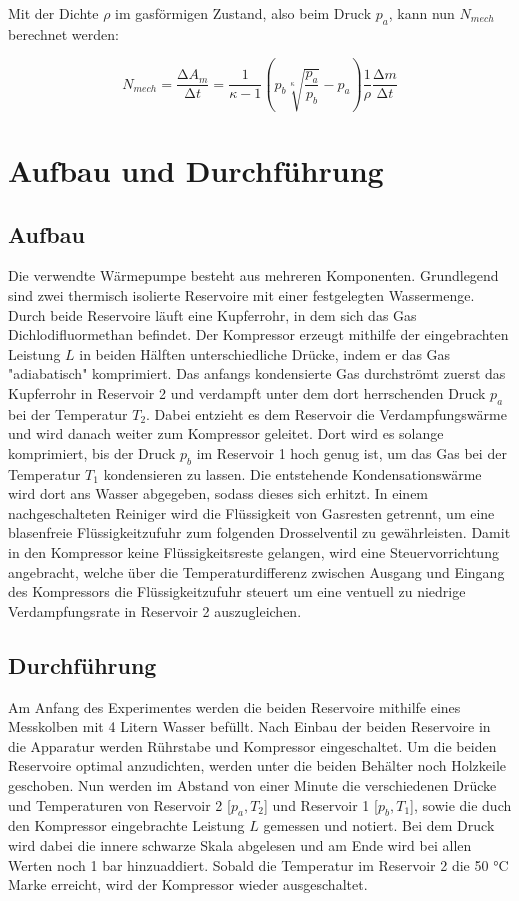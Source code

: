 Mit der Dichte $\rho$ im gasförmigen Zustand, also beim Druck $p_a$, kann nun $N_{mech}$ berechnet werden:

\begin{equation}
  \label{eqn:Nmech}
  N_{mech} = \frac{\increment A_m}{\increment t} =  \frac{1}{\kappa - 1} \left( p_b \sqrt[\kappa]{\frac{p_a}{p_b}} - p_a \right) \frac{1}{\rho} \frac{\increment m}{\increment t}
\end{equation}

\section{Aufbau und Durchführung}

\subsection{Aufbau}

Die verwendte Wärmepumpe besteht aus mehreren Komponenten. Grundlegend sind zwei thermisch isolierte Reservoire mit einer festgelegten
Wassermenge. Durch beide Reservoire läuft eine Kupferrohr, in dem sich das Gas Dichlodifluormethan befindet. Der Kompressor erzeugt
mithilfe der eingebrachten Leistung $L$ in beiden
Hälften unterschiedliche Drücke, indem er das Gas "adiabatisch" komprimiert. Das anfangs kondensierte Gas durchströmt zuerst das Kupferrohr in Reservoir 2 und
verdampft unter dem dort herrschenden Druck $p_a$ bei der Temperatur $T_2$. Dabei entzieht es dem Reservoir die Verdampfungswärme und wird danach
weiter zum Kompressor geleitet. Dort wird es solange komprimiert, bis der Druck $p_b$ im Reservoir 1 hoch genug ist, um das Gas bei der
Temperatur $T_1$ kondensieren zu lassen. Die entstehende
Kondensationswärme wird dort ans Wasser abgegeben, sodass dieses sich erhitzt. In einem nachgeschalteten Reiniger wird die Flüssigkeit
von Gasresten getrennt, um eine blasenfreie Flüssigkeitzufuhr zum folgenden Drosselventil zu gewährleisten. Damit in den Kompressor keine
Flüssigkeitsreste gelangen, wird eine Steuervorrichtung angebracht, welche über die Temperaturdifferenz zwischen Ausgang und Eingang
des Kompressors die Flüssigkeitzufuhr steuert um eine ventuell zu niedrige Verdampfungsrate in Reservoir 2 auszugleichen.

\subsection{Durchführung}

Am Anfang des Experimentes werden die beiden Reservoire mithilfe eines Messkolben mit 4 Litern Wasser befüllt. Nach Einbau der beiden Reservoire
in die Apparatur werden Rührstabe und Kompressor eingeschaltet. Um die beiden Reservoire optimal anzudichten, werden unter die beiden Behälter
noch Holzkeile geschoben. Nun werden im Abstand von einer Minute die verschiedenen Drücke und Temperaturen
von Reservoir 2 [$p_a, T_2$] und Reservoir 1 [$p_b, T_1$], sowie die duch den Kompressor eingebrachte Leistung $L$ gemessen und notiert. Bei dem Druck
wird dabei die innere schwarze Skala abgelesen und am Ende wird bei allen Werten noch 1 bar hinzuaddiert. Sobald
die Temperatur im Reservoir 2 die 50 °C Marke erreicht, wird der Kompressor wieder ausgeschaltet.

